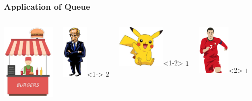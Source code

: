 \begin{frame}
\frametitle{Application of Queue}

\begin{columns}
    \includegraphics[height=3.8cm]{Image/Burger_Stall.jpg}
  \begin{center}
    \includegraphics[height=2.7cm]{Image/putin.jpg}<1->
    $2$
  \end{center}

  \begin{center}
    \includegraphics[height=2.1cm]{Image/pikachu.jpg}<1-2>
    $1$
  \end{center}

    \begin{center}
      \includegraphics[height=2.5cm]{Image/ronaldo.png}<2>
      $1$
    \end{center}

  \end{columns}

\end{frame}


